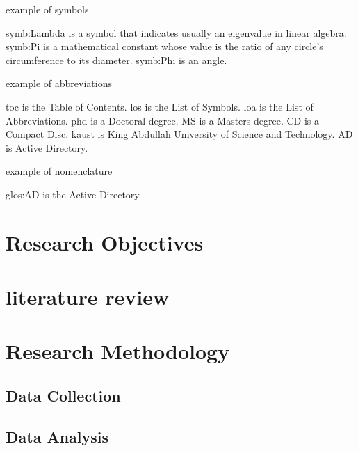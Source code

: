 example of symbols

\gls{symb:Lambda} is a symbol that indicates usually an eigenvalue in linear algebra. \gls{symb:Pi} is a mathematical constant whose value is the ratio of any circle's circumference to its diameter. \gls{symb:Phi} is an angle.

example of abbreviations

\gls{toc} is the Table of Contents. \gls{los} is the List of Symbols. \gls{loa} is the List of Abbreviations. \gls{phd} is a Doctoral degree. \gls{MS} is a Masters degree. \gls{CD} is a Compact Disc. \gls{kaust} is King Abdullah University of Science and Technology. \gls{AD} is Active Directory.


example of nomenclature

\gls{glos:AD} is the Active Directory.

\section{Research Objectives}

\section{literature review}

\section{Research Methodology}

\subsection{Data Collection}

\subsection{Data Analysis}

